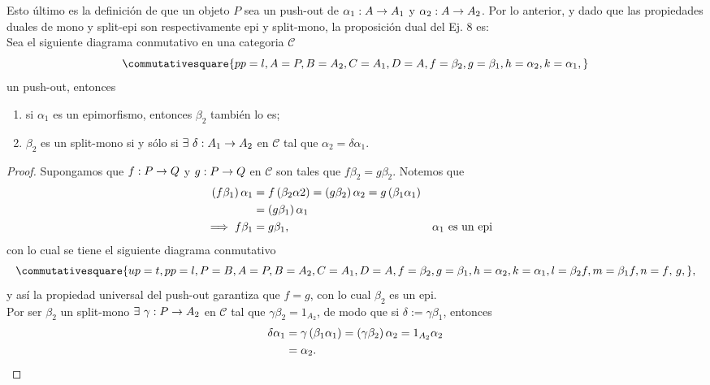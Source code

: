 \documentclass{article}
\begin{document}
\begin{enumerate}[label=\textbf{Ej \arabic*.}]
\begin{enumerate}[label=PB\textsuperscript{*}\Roman*)]
	\end{enumerate}
	Esto último es la definición de que un objeto $P$ sea un push-out de $\catarrow{\alpha_1}{A}{A_1}{}$ y $\catarrow{\alpha_2}{A}{A_2}{}$. Por lo anterior, y dado que las propiedades duales de mono y split-epi son respectivamente epi y split-mono, la proposición dual del Ej. 8 es:\\
	Sea el siguiente diagrama conmutativo en una categoria $\mathscr{C}$
	\begin{equation*}
		\commutativesquare{pp=l,A=P,B=A_2,C=A_1,D=A, f=\beta_2,g=\beta_1,h=\alpha_2,k=\alpha_1,}
	\end{equation*}	
	un push-out, entonces
		\begin{enumerate}
			\item si $\alpha_1$ es un epimorfismo, entonces $\beta_2$ también lo es;
			\item $\beta_2$ es un split-mono  si y sólo si $\exists\ \catarrow{\delta}{A_1}{A_2}{}$ en $\mathscr{C}$ tal que $\alpha_2=\delta\alpha_1$.
		\end{enumerate}
	\begin{proof}
		 Supongamos que $\catarrow{f}{P}{Q}{}$ y $\catarrow{g}{P}{Q}{}$ en $\mathscr{C}$ son tales que $f\beta_2=g\beta_2$. Notemos que
		\begin{align*}
			\left(f\beta_1\right)\alpha_1&=f\left(\beta_2\alpha 2\right)=\left(g\beta_2 \right)\alpha_2=g\left(\beta_1\alpha_1\right)\\
			&=\left(g\beta_1\right)\alpha_1\\
			\implies f\beta_1 &=g\beta_1 , && \alpha_1\text{ es un epi}
		\end{align*}
		con lo cual se tiene el siguiente diagrama conmutativo
		\begin{equation*}
			\commutativesquare{up=t,pp=l,P=B,A=P,B=A_2,C=A_1,D=A,f=\beta_2,g=\beta_1,h=\alpha_2,k=\alpha_1,l=\beta_2 f,m=\beta_1 f,n=f\text{, }g,},
		\end{equation*}
		y así la propiedad universal del push-out garantiza que $f=g$, con lo cual $\beta_2$ es un epi.\\
		 Por ser $\beta_2$ un split-mono $\exists\ \catarrow{\gamma}{P}{A_2}{}$ en $\mathscr{C}$ tal que $\gamma\beta_2=1_{A_2}$, de modo que si $\delta:=\gamma\beta_1$, entonces
		\begin{align*}
			\delta\alpha_1&=\gamma\left(\beta_1\alpha_1\right)=\left(\gamma\beta_2\right)\alpha_2=1_{A_2}\alpha_2\\
			&=\alpha_2. 
		\end{align*}

\end{proof}
\end{enumerate}
\end{document}
